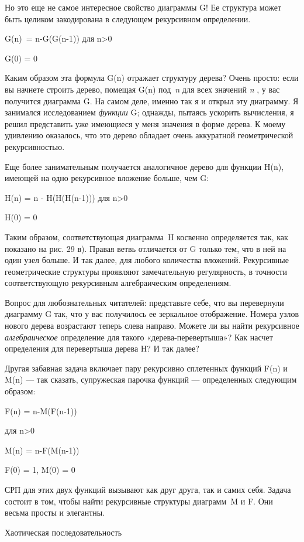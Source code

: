 Но это еще не самое интересное свойство диаграммы G! Ее структура может быть целиком закодирована в следующем рекурсивном определении.

G(n)~= n-G(G(n-1)) для n\textgreater0

G(0) = 0

Каким образом эта формула G(n) отражает структуру дерева? Очень просто: если вы начнете строить дерево, помещая G(n) под~\emph{n} для всех значений \emph{n} , у вас получится диаграмма G. На самом деле, именно так я и открыл эту диаграмму. Я занимался исследованием \emph{функции} G; однажды, пытаясь ускорить вычисления, я решил представить уже имеющиеся у меня значения в форме дерева. К моему удивлению оказалось, что это дерево обладает очень аккуратной геометрической рекурсивностью.

Еще более занимательным получается аналогичное дерево для функции H(n), имеющей на одно рекурсивное вложение больше, чем G:

H(n) = n - H(H(H(n-1))) для n\textgreater0

H(0) = 0

Таким образом, соответствующая диаграмма~H косвенно определяется так, как показано на рис. 29 в). Правая ветвь отличается от G только тем, что в ней на один узел больше. И так далее, для любого количества вложений. Рекурсивные геометрические структуры проявляют замечательную регулярность, в точности соответствующую рекурсивным алгебраическим определениям.

Вопрос для любознательных читателей: представьте себе, что вы перевернули диаграмму G так, что у вас получилось ее зеркальное отображение. Номера узлов нового дерева возрастают теперь слева направо. Можете ли вы найти рекурсивное \emph{алгебраическое} определение для такого «дерева-перевертыша»? Как насчет определения для перевертыша дерева H? И так далее?

Другая забавная задача включает пару рекурсивно сплетенных функций F(n) и M(n) --- так сказать, супружеская парочка функций --- определенных следующим образом:

F(n) = n-M(F(n-1))

для n\textgreater0

M(n) = n-F(M(n-1))

F(0) = 1, M(0) = 0

СРП для этих двух функций вызывают как друг друга, так и самих себя. Задача состоит в том, чтобы найти рекурсивные структуры диаграмм~M и F. Они весьма просты и элегантны.

Хаотическая последовательность

